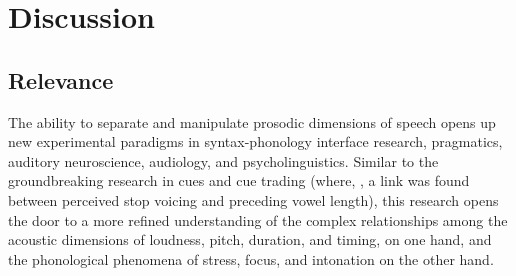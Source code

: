 \chapter{Discussion}

\section{Relevance}
The ability to separate and manipulate prosodic dimensions of speech opens up new experimental paradigms in syntax-phonology interface research, pragmatics, auditory neuroscience, audiology, and psycholinguistics.  Similar to the groundbreaking research in cues and cue trading (where, \eg, a link was found between perceived stop voicing and preceding vowel length), this research opens the door to a more refined understanding of the complex relationships among the acoustic dimensions of loudness, pitch, duration, and timing, on one hand, and the phonological phenomena of stress, focus, and intonation on the other hand.

